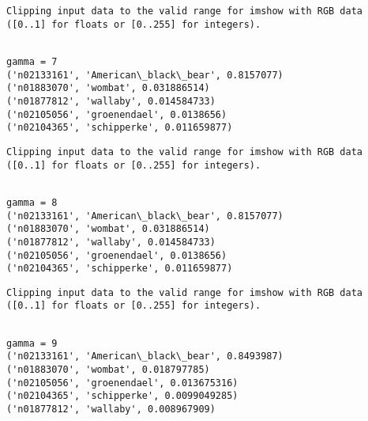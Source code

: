 \documentclass[11pt]{article}
\begin{document}
    \begin{Verbatim}[commandchars=\\\{\}]
Clipping input data to the valid range for imshow with RGB data ([0..1] for floats or [0..255] for integers).

    \end{Verbatim}

    \begin{Verbatim}[commandchars=\\\{\}]

gamma = 7
('n02133161', 'American\_black\_bear', 0.8157077)
('n01883070', 'wombat', 0.031886514)
('n01877812', 'wallaby', 0.014584733)
('n02105056', 'groenendael', 0.0138656)
('n02104365', 'schipperke', 0.011659877)

    \end{Verbatim}

    \begin{Verbatim}[commandchars=\\\{\}]
Clipping input data to the valid range for imshow with RGB data ([0..1] for floats or [0..255] for integers).

    \end{Verbatim}

    \begin{Verbatim}[commandchars=\\\{\}]

gamma = 8
('n02133161', 'American\_black\_bear', 0.8157077)
('n01883070', 'wombat', 0.031886514)
('n01877812', 'wallaby', 0.014584733)
('n02105056', 'groenendael', 0.0138656)
('n02104365', 'schipperke', 0.011659877)

    \end{Verbatim}

    \begin{Verbatim}[commandchars=\\\{\}]
Clipping input data to the valid range for imshow with RGB data ([0..1] for floats or [0..255] for integers).

    \end{Verbatim}

    \begin{Verbatim}[commandchars=\\\{\}]

gamma = 9
('n02133161', 'American\_black\_bear', 0.8493987)
('n01883070', 'wombat', 0.018797785)
('n02105056', 'groenendael', 0.013675316)
('n02104365', 'schipperke', 0.0099049285)
('n01877812', 'wallaby', 0.008967909)

    \end{Verbatim}
\end{document}
